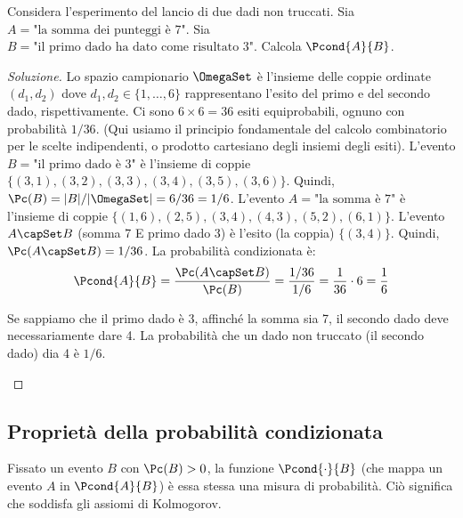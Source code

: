 \begin{exercise}
Considera l'esperimento del lancio di due dadi non truccati.
Sia $A = \text{"la somma dei punteggi è 7"}$.
Sia $B = \text{"il primo dado ha dato come risultato 3"}$.
Calcola $\Pcond{A}{B}$.
\end{exercise}
\begin{proof}[Soluzione]
Lo spazio campionario $\OmegaSet$ è l'insieme delle coppie ordinate $(d_1, d_2)$ dove $d_1, d_2 \in \{1, \dots, 6\}$ rappresentano l'esito del primo e del secondo dado, rispettivamente. Ci sono $6 \times 6 = 36$ esiti equiprobabili, ognuno con probabilità $1/36$. (Qui usiamo il principio fondamentale del calcolo combinatorio per le scelte indipendenti, o prodotto cartesiano degli insiemi degli esiti).
L'evento $B = \text{"il primo dado è 3"}$ è l'insieme di coppie $\{(3,1), (3,2), (3,3), (3,4), (3,5), (3,6)\}$.
Quindi, $\Pc(B) = |B|/|\OmegaSet| = 6/36 = 1/6$.
L'evento $A = \text{"la somma è 7"}$ è l'insieme di coppie $\{(1,6), (2,5), (3,4), (4,3), (5,2), (6,1)\}$.
L'evento $A \capSet B$ (somma 7 E primo dado 3) è l'esito (la coppia) $\{(3,4)\}$.
Quindi, $\Pc(A \capSet B) = 1/36$.
La probabilità condizionata è:
\[ \Pcond{A}{B} = \frac{\Pc(A \capSet B)}{\Pc(B)} = \frac{1/36}{1/6} = \frac{1}{36} \cdot 6 = \frac{1}{6} \]
\begin{remark}
Se sappiamo che il primo dado è 3, affinché la somma sia 7, il secondo dado deve necessariamente dare 4. La probabilità che un dado non truccato (il secondo dado) dia 4 è $1/6$.
\end{remark}
\end{proof}

\subsection{Proprietà della probabilità condizionata}
Fissato un evento $B$ con $\Pc(B)>0$, la funzione $\Pcond{\cdot}{B}$ (che mappa un evento $A$ in $\Pcond{A}{B}$) è essa stessa una misura di probabilità. Ciò significa che soddisfa gli assiomi di Kolmogorov.

